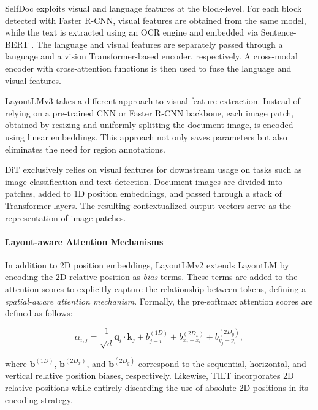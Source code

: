 SelfDoc \citep{li2021selfdoc} exploits visual and language features at the block-level. For each block detected with Faster R-CNN, visual features are obtained from the same model, while the text is extracted using an \ac{OCR} engine and embedded via Sentence-BERT \citep{reimers2019sentence}. The language and visual features are separately passed through a language and a vision Transformer-based encoder, respectively. A cross-modal encoder with cross-attention functions is then used to fuse the language and visual features.  

LayoutLMv3 \citep{huang2022layoutlmv3} takes a different approach to visual feature extraction. Instead of relying on a pre-trained \ac{CNN} or Faster R-CNN backbone, each image patch, obtained by resizing and uniformly splitting the document image, is encoded using linear embeddings. This approach not only saves parameters but also eliminates the need for region annotations.

\ac{DiT} \citep{li2022dit} exclusively relies on visual features for downstream usage on tasks such as image classification and text detection. Document images are divided into patches, added to 1D position embeddings, and passed through a stack of Transformer layers. The resulting contextualized output vectors serve as the representation of image patches.

\paragraph{Layout-aware Attention Mechanisms}

In addition to 2D position embeddings, LayoutLMv2 \citep{xu2020layoutlmv2} extends LayoutLM by encoding the 2D relative position as \textit{bias} terms. These terms are added to the attention scores to explicitly capture the relationship between tokens, defining a \textit{spatial-aware attention mechanism}. Formally, the pre-softmax attention scores are defined as follows:

\begin{equation}
    \alpha_{i,j} = \dfrac{1}{\sqrt{d}} \bm{q}_i \cdot \bm{k}_j + b^{(1D)}_{j - i} + b^{(2D_x)}_{x_j - x_i} + b^{(2D_y)}_{y_j - y_i},
\end{equation}

\noindent where $\bm{b}^{(1D)}$, $\bm{b}^{(2D_x)}$, and $\bm{b}^{(2D_y)}$ correspond to the sequential, horizontal, and vertical relative position biases, respectively. Likewise, TILT \citep{powalski2021going} incorporates 2D relative positions while entirely discarding the use of absolute 2D positions in its encoding strategy. 

